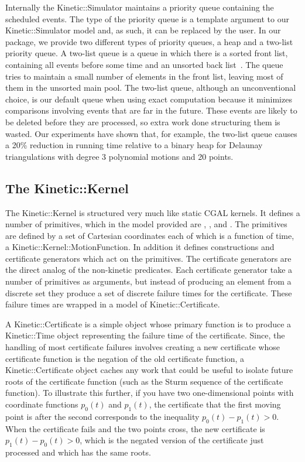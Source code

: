 Internally the Kinetic::Simulator maintains a priority queue
containing the scheduled events. The type of the priority queue is a
template argument to our Kinetic::Simulator model and, as such, it can
be replaced by the user.  In our package, we provide two different
types of priority queues, a heap and a two-list priority queue.  A
two-list queue is a queue in which there is a sorted front list,
containing all events before some time and an unsorted back
list~\cite{5686}. The queue tries to maintain a small number of
elements in the front list, leaving most of them in the unsorted main
pool. The two-list queue, although an unconventional choice, is our
default queue when using exact computation because it minimizes
comparisons involving events that are far in the future.  These events
are likely to be deleted before they are processed, so extra work done
structuring them is wasted.  Our experiments have shown that, for
example, the two-list queue causes a 20\% reduction in running time
relative to a binary heap for Delaunay triangulations with degree 3
polynomial motions and 20 points.



\subsection{The Kinetic::Kernel}

The Kinetic::Kernel is structured very much like static CGAL
kernels. It defines a number of primitives, which in the model
provided are ,
,  and
. The primitives are defined by
a set of Cartesian coordinates each of which is a function of time, a
Kinetic::Kernel::MotionFunction. In addition it defines constructions
and certificate generators which act on the primitives.  The
certificate generators are the direct analog of the non-kinetic
predicates. Each certificate generator take a number of primitives as
arguments, but instead of producing an element from a discrete set
they produce a set of discrete failure times for the certificate.
These failure times are wrapped in a model of Kinetic::Certificate.

A Kinetic::Certificate is a simple object whose primary function is to
produce a Kinetic::Time object representing the failure time of the
certificate.  Since, the handling of most certificate failures
involves creating a new certificate whose certificate function is the
negation of the old certificate function, a Kinetic::Certificate
object caches any work that could be useful to isolate future roots of
the certificate function (such as the Sturm sequence of the
certificate function). To illustrate this further, if you have two
one-dimensional points with coordinate functions $p_0(t)$ and
$p_1(t)$, the certificate that the first moving point is after the
second corresponds to the inequality $p_0(t) - p_1(t) > 0$.  When the
certificate fails and the two points cross, the new certificate is
$p_1(t)- p_0(t) > 0$, which is the negated version of the certificate
just processed and which has the same roots.

